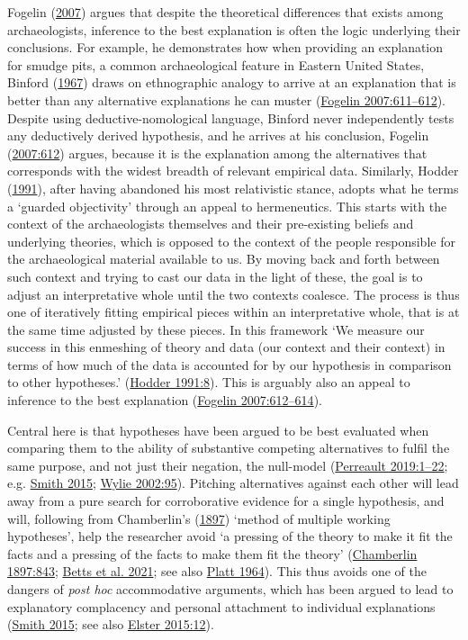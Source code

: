 \documentclass[
  a4paper,
  oneside]{uiophdthesis}
\begin{document}
Fogelin (\protect\hyperlink{ref-fogelin2007}{2007}) argues that despite the theoretical differences that exists among archaeologists, inference to the best explanation is often the logic underlying their conclusions. For example, he demonstrates how when providing an explanation for smudge pits, a common archaeological feature in Eastern United States, Binford (\protect\hyperlink{ref-binford1967}{1967}) draws on ethnographic analogy to arrive at an explanation that is better than any alternative explanations he can muster (\protect\hyperlink{ref-fogelin2007}{Fogelin 2007:611--612}). Despite using deductive-nomological language, Binford never independently tests any deductively derived hypothesis, and he arrives at his conclusion, Fogelin (\protect\hyperlink{ref-fogelin2007}{2007:612}) argues, because it is the explanation among the alternatives that corresponds with the widest breadth of relevant empirical data. Similarly, Hodder (\protect\hyperlink{ref-hodder1991}{1991}), after having abandoned his most relativistic stance, adopts what he terms a `guarded objectivity' through an appeal to hermeneutics. This starts with the context of the archaeologists themselves and their pre-existing beliefs and underlying theories, which is opposed to the context of the people responsible for the archaeological material available to us. By moving back and forth between such context and trying to cast our data in the light of these, the goal is to adjust an interpretative whole until the two contexts coalesce. The process is thus one of iteratively fitting empirical pieces within an interpretative whole, that is at the same time adjusted by these pieces. In this framework `We measure our success in this enmeshing of theory and data (our context and their context) in terms of how much of the data is accounted for by our hypothesis in comparison to other hypotheses.' (\protect\hyperlink{ref-hodder1991}{Hodder 1991:8}). This is arguably also an appeal to inference to the best explanation (\protect\hyperlink{ref-fogelin2007}{Fogelin 2007:612--614}).

Central here is that hypotheses have been argued to be best evaluated when comparing them to the ability of substantive competing alternatives to fulfil the same purpose, and not just their negation, the null-model (\protect\hyperlink{ref-perreault2019}{Perreault 2019:1--22}; e.g. \protect\hyperlink{ref-smith2015}{Smith 2015}; \protect\hyperlink{ref-wylie2002}{Wylie 2002:95}). Pitching alternatives against each other will lead away from a pure search for corroborative evidence for a single hypothesis, and will, following from Chamberlin's (\protect\hyperlink{ref-chamberlin1897}{1897}) `method of multiple working hypotheses', help the researcher avoid `a pressing of the theory to make it fit the facts and a pressing of the facts to make them fit the theory' (\protect\hyperlink{ref-chamberlin1897}{Chamberlin 1897:843}; \protect\hyperlink{ref-betts2021}{Betts et al. 2021}; see also \protect\hyperlink{ref-platt1964}{Platt 1964}). This thus avoids one of the dangers of \emph{post hoc} accommodative arguments, which has been argued to lead to explanatory complacency and personal attachment to individual explanations (\protect\hyperlink{ref-smith2015}{Smith 2015}; see also \protect\hyperlink{ref-elster2015}{Elster 2015:12}).
\end{document}
